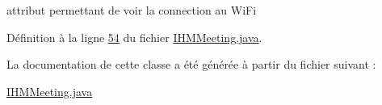 attribut permettant de voir la connection au Wi\+Fi 



Définition à la ligne \hyperlink{_i_h_m_meeting_8java_source_l00054}{54} du fichier \hyperlink{_i_h_m_meeting_8java_source}{I\+H\+M\+Meeting.\+java}.



La documentation de cette classe a été générée à partir du fichier suivant \+:\begin{DoxyCompactItemize}
\item 
\hyperlink{_i_h_m_meeting_8java}{I\+H\+M\+Meeting.\+java}\end{DoxyCompactItemize}

